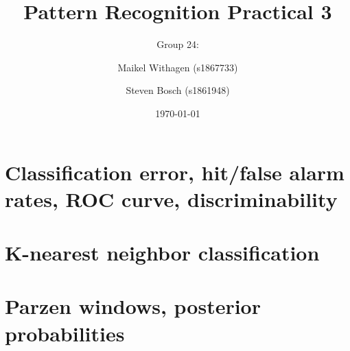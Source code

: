 \documentclass[10pt]{article}
\title{Pattern Recognition Practical 3}
\author{Group 24: \and Maikel Withagen (s1867733) \and Steven Bosch (s1861948)}
\date{\today}
\begin{document}
\maketitle

\section{Classification error, hit/false alarm rates, ROC curve, discriminability}
\subsection{}


\section{K-nearest neighbor classification}
\section{Parzen windows, posterior probabilities}
\end{document}
